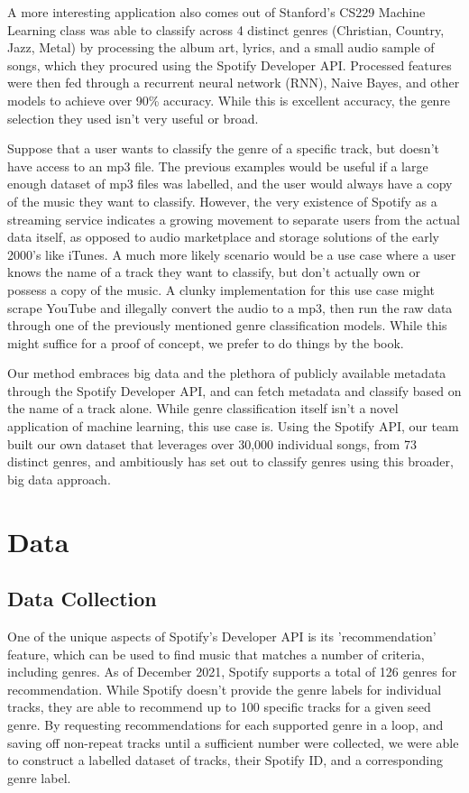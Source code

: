 \documentclass[conference]{IEEEtran}
\begin{document}
A more interesting application also comes out of Stanford's CS229 Machine Learning class was able to classify across 4 distinct genres (Christian, Country, Jazz, Metal) by processing the album art, lyrics, and a small audio sample of songs, which they procured using the Spotify Developer API. Processed features were then fed through a recurrent neural network (RNN), Naive Bayes, and other models to achieve over 90\% accuracy. While this is excellent accuracy, the genre selection they used isn't very useful or broad.

Suppose that a user wants to classify the genre of a specific track, but doesn't have access to an mp3 file. The previous examples would be useful if a large enough dataset of mp3 files was labelled, and the user would always have a copy of the music they want to classify. However, the very existence of Spotify as a streaming service indicates a growing movement to separate users from the actual data itself, as opposed to audio marketplace and storage solutions of the early 2000's like iTunes. A much more likely scenario would be a use case where a user knows the name of a track they want to classify, but don't actually own or possess a copy of the music. A clunky implementation for this use case might scrape YouTube and illegally convert the audio to a mp3, then run the raw data through one of the previously mentioned genre classification models. While this might suffice for a proof of concept, we prefer to do things by the book.

Our method embraces big data and the plethora of publicly available metadata through the Spotify Developer API, and can fetch metadata and classify based on the name of a track alone. While genre classification itself isn't a novel application of machine learning, this use case is. Using the Spotify API, our team built our own dataset that leverages over 30,000 individual songs, from 73 distinct genres, and ambitiously has set out to classify genres using this broader, big data approach.

\section{Data}
\subsection{Data Collection}
One of the unique aspects of Spotify's Developer API is its 'recommendation' feature, which can be used to find music that matches a number of criteria, including genres. As of December 2021, Spotify supports a total of 126 genres for recommendation. While Spotify doesn't provide the genre labels for individual tracks, they are able to recommend up to 100 specific tracks for a given seed genre. By requesting recommendations for each supported genre in a loop, and saving off non-repeat tracks until a sufficient number were collected, we were able to construct a labelled dataset of tracks, their Spotify ID, and a corresponding genre label. 
\end{document}
